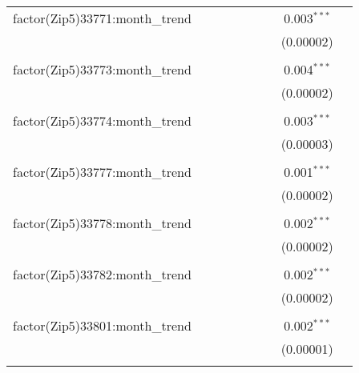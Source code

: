 \begin{table}[H]
{\begin{tabular}{@{\extracolsep{5pt}}lcccccccc}
  factor(Zip5)33771:month\_trend &  &  &  &  &  &  & 0.003$^{***}$ &  \\  

   &  &  &  &  &  &  & (0.00002) &  \\  

   & & & & & & & & \\  

  factor(Zip5)33773:month\_trend &  &  &  &  &  &  & 0.004$^{***}$ &  \\  

   &  &  &  &  &  &  & (0.00002) &  \\  

   & & & & & & & & \\  

  factor(Zip5)33774:month\_trend &  &  &  &  &  &  & 0.003$^{***}$ &  \\  

   &  &  &  &  &  &  & (0.00003) &  \\  

   & & & & & & & & \\  

  factor(Zip5)33777:month\_trend &  &  &  &  &  &  & 0.001$^{***}$ &  \\  

   &  &  &  &  &  &  & (0.00002) &  \\  

   & & & & & & & & \\  

  factor(Zip5)33778:month\_trend &  &  &  &  &  &  & 0.002$^{***}$ &  \\  

   &  &  &  &  &  &  & (0.00002) &  \\  

   & & & & & & & & \\  

  factor(Zip5)33782:month\_trend &  &  &  &  &  &  & 0.002$^{***}$ &  \\  

   &  &  &  &  &  &  & (0.00002) &  \\  

   & & & & & & & & \\  

  factor(Zip5)33801:month\_trend &  &  &  &  &  &  & 0.002$^{***}$ &  \\  

   &  &  &  &  &  &  & (0.00001) &  \\  

   & & & & & & & & \\  


\end{tabular}}
\end{table}
